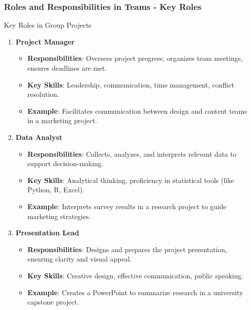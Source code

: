 \documentclass[aspectratio=169]{beamer}
\begin{document}
\begin{frame}[fragile]
    \frametitle{Roles and Responsibilities in Teams - Key Roles}
    \begin{block}{Key Roles in Group Projects}
        \begin{enumerate}
            \item \textbf{Project Manager}
                \begin{itemize}
                    \item \textbf{Responsibilities}: Oversees project progress, organizes team meetings, ensures deadlines are met.
                    \item \textbf{Key Skills}: Leadership, communication, time management, conflict resolution.
                    \item \textbf{Example}: Facilitates communication between design and content teams in a marketing project.
                \end{itemize}
            \item \textbf{Data Analyst}
                \begin{itemize}
                    \item \textbf{Responsibilities}: Collects, analyzes, and interprets relevant data to support decision-making.
                    \item \textbf{Key Skills}: Analytical thinking, proficiency in statistical tools (like Python, R, Excel).
                    \item \textbf{Example}: Interprets survey results in a research project to guide marketing strategies.
                \end{itemize}
            \item \textbf{Presentation Lead}
                \begin{itemize}
                    \item \textbf{Responsibilities}: Designs and prepares the project presentation, ensuring clarity and visual appeal.
                    \item \textbf{Key Skills}: Creative design, effective communication, public speaking.
                    \item \textbf{Example}: Creates a PowerPoint to summarize research in a university capstone project.
                \end{itemize}
        \end{enumerate}
    \end{block}
\end{frame}
\end{document}
